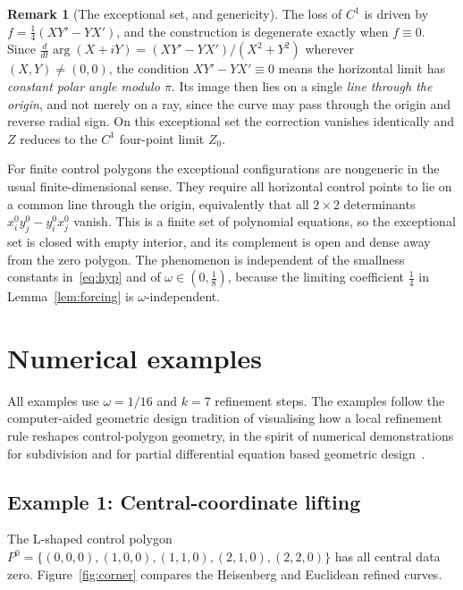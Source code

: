\documentclass{article}
\theoremstyle{plain}
\theoremstyle{definition}
\newtheorem{remark}[theorem]{Remark}
\begin{document}
\begin{remark}[The exceptional set, and genericity]\label{rem:generic}
The loss of $C^1$ is driven by $f=\tfrac14(XY'-YX')$, and the construction is
degenerate exactly when $f\equiv0$. Since
$\tfrac{d}{dt}\arg(X+iY)=(XY'-YX')/(X^2+Y^2)$ wherever $(X,Y)\neq(0,0)$, the
condition $XY'-YX'\equiv0$ means the horizontal limit has \emph{constant polar
angle modulo $\pi$}. Its image then lies on a single \emph{line through the
origin}, and not merely on a ray, since the curve may pass through the origin and
reverse radial sign. On this exceptional set the correction vanishes identically
and $Z$ reduces to the $C^1$ four-point limit $Z_0$.

For finite control polygons the exceptional configurations are nongeneric in the
usual finite-dimensional sense. They require all horizontal control points to lie
on a common line through the origin, equivalently that all $2\times2$
determinants $x_i^0 y_j^0-y_i^0 x_j^0$ vanish. This is a finite set of polynomial
equations, so the exceptional set is closed with empty interior, and its
complement is open and dense away from the zero polygon. The phenomenon is
independent of the smallness constants in~\eqref{eq:hyp} and of
$\omega\in(0,\tfrac18)$, because the limiting coefficient $\tfrac14$ in
Lemma~\ref{lem:forcing} is $\omega$-independent.
\end{remark}

\section{Numerical examples}\label{sec:numerics}

All examples use $\omega=1/16$ and $k=7$ refinement steps. The examples follow
the computer-aided geometric design tradition of visualising how a local
refinement rule reshapes control-polygon geometry, in the spirit of numerical
demonstrations for subdivision and for partial differential equation based
geometric design~\cite{DGL87, UgailBW99a, MonterdeUgail04, ShengUgail10}.

\subsection{Example 1: Central-coordinate lifting}

The L-shaped control polygon
$P^0=\{(0,0,0),(1,0,0),(1,1,0),(2,1,0),(2,2,0)\}$
has all central data zero. Figure~\ref{fig:corner} compares the Heisenberg
and Euclidean refined curves.
\end{document}
